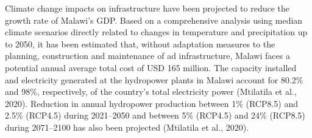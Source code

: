 \documentclass[
]{book}
\begin{document}
Climate change impacts on infrastructure have been projected to reduce the growth rate of Malawi's GDP. Based on a comprehensive analysis using median climate scenarios directly related to changes in temperature and precipitation up to 2050, it has been estimated that, without adaptation measures to the planning, construction and maintenance of ad infrastructure, Malawi faces a potential annual average total cost of USD 165 million. The capacity installed and electricity generated at the hydropower plants in Malawi account for 80.2\% and 98\%, respectively, of the country's total electricity power (Mtilatila et al., 2020). Reduction in annual hydropower production between 1\% (RCP8.5) and 2.5\% (RCP4.5) during 2021--2050 and between 5\% (RCP4.5) and 24\% (RCP8.5) during 2071--2100 has also been projected (Mtilatila et al., 2020).

\providecommand{\docline}[3]{\noalign{\global\setlength{\arrayrulewidth}{#1}}\arrayrulecolor[HTML]{#2}\cline{#3}}

\setlength{\tabcolsep}{2pt}

\renewcommand*{\arraystretch}{1.5}
\end{document}
